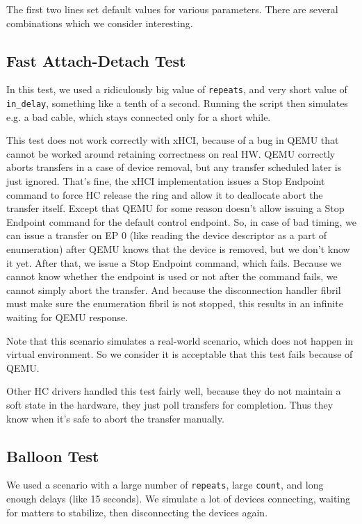 The first two lines set default values for various parameters. There are
several combinations which we consider interesting.

\subsection{Fast Attach-Detach Test}

In this test, we used a ridiculously big value of \texttt{repeats}, and very
short value of \texttt{in\_delay}, something like a tenth of a second. Running
the script then simulates e.g. a bad cable, which stays connected only for
a short while.

This test does not work correctly with xHCI, because of a bug in QEMU that cannot
be worked around retaining correctness on real HW. QEMU correctly aborts
transfers in a case of device removal, but any transfer scheduled later is just
ignored. That's fine, the xHCI implementation issues a Stop Endpoint command to
force HC release the ring and allow it to deallocate abort the transfer itself.
Except that QEMU for some reason doesn't allow issuing a Stop Endpoint command
for the default control endpoint. So, in case of bad timing, we can issue
a transfer on EP 0 (like reading the device descriptor as a part of
enumeration) after QEMU knows that the device is removed, but we don't know it
yet. After that, we issue a Stop Endpoint command, which fails. Because we
cannot know whether the endpoint is used or not after the command fails, we
cannot simply abort the transfer. And because the disconnection handler fibril
must make sure the enumeration fibril is not stopped, this results in an
infinite waiting for QEMU response.

Note that this scenario simulates a real-world scenario, which does not happen
in virtual environment. So we consider it is acceptable that this test fails
because of QEMU.

Other HC drivers handled this test fairly well, because they do not maintain
a soft state in the hardware, they just poll transfers for completion. Thus
they know when it's safe to abort the transfer manually.

\subsection{Balloon Test}

We used a scenario with a large number of \texttt{repeats}, large \texttt{count},
and long enough delays (like 15 seconds). We simulate a lot of devices connecting,
waiting for matters to stabilize, then disconnecting the devices again.

